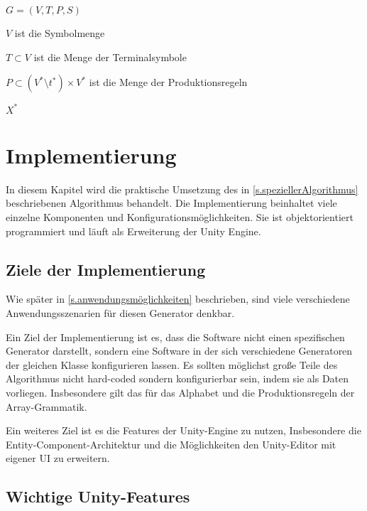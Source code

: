 $ G = (V, T, P, S) $

$ V $ ist die Symbolmenge 

$ T \subset V $ ist die Menge der Terminalsymbole

$ P \subset (V^\ast \setminus t^\ast) \times V^\ast $ ist die Menge der Produktionsregeln

$ X^\ast $ 




\chapter{Implementierung}\label{c.implementierung}

In diesem Kapitel wird die praktische Umsetzung des in \ref{s.speziellerAlgorithmus} beschriebenen Algorithmus behandelt. Die Implementierung beinhaltet viele einzelne Komponenten und Konfigurationsmöglichkeiten. Sie ist objektorientiert programmiert und läuft als Erweiterung der Unity Engine. 



\section{Ziele der Implementierung}

Wie später in \ref{s.anwendungsmöglichkeiten} beschrieben, sind viele verschiedene Anwendungsszenarien für diesen Generator denkbar. 

Ein Ziel der Implementierung ist es, dass die Software nicht einen spezifischen Generator darstellt, sondern eine Software in der sich verschiedene Generatoren der gleichen Klasse konfigurieren lassen. Es sollten möglichst große Teile des Algorithmus nicht hard-coded sondern konfigurierbar sein, indem sie als Daten vorliegen. Insbesondere gilt das für das Alphabet und die Produktionsregeln der Array-Grammatik.

Ein weiteres Ziel ist es die Features der Unity-Engine zu nutzen, Insbesondere die Entity-Component-Architektur und die Möglichkeiten den Unity-Editor mit eigener UI zu erweitern. 

\section{Wichtige Unity-Features}

